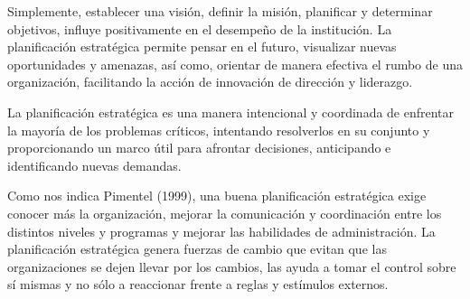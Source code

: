 Simplemente, establecer una visión, definir la misión, planificar y determinar objetivos, influye positivamente en el desempeño de la institución. La planificación estratégica permite pensar en el futuro, visualizar nuevas oportunidades y amenazas, así como, orientar de manera efectiva el rumbo de una organización, facilitando la acción de innovación de dirección y liderazgo.

La planificación estratégica es una manera intencional y coordinada de enfrentar la mayoría de los problemas críticos, intentando resolverlos en su conjunto y proporcionando un marco útil para afrontar decisiones, anticipando e identificando nuevas demandas.

Como nos indica Pimentel (1999), una buena planificación estratégica exige conocer más la organización, mejorar la comunicación y coordinación entre los distintos niveles y programas y mejorar las habilidades de administración. La planificación estratégica genera fuerzas de cambio que evitan que las organizaciones se dejen llevar por los cambios, las ayuda a tomar el control sobre sí mismas y no sólo a reaccionar frente a reglas y estímulos externos.

